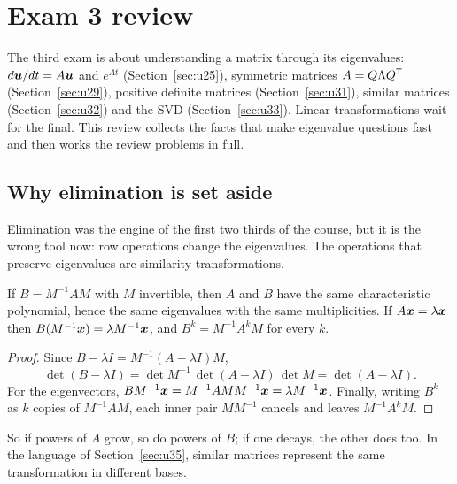 \section{Exam 3 review}\label{sec:u37}

The third exam is about understanding a matrix through its eigenvalues: $d\boldsymbol{u}/dt=A\boldsymbol{u}$ and $e^{At}$ (Section~\ref{sec:u25}), symmetric matrices $A=Q\Lambda Q^{\mathsf{T}}$ (Section~\ref{sec:u29}), positive definite matrices (Section~\ref{sec:u31}), similar matrices (Section~\ref{sec:u32}) and the SVD (Section~\ref{sec:u33}). Linear transformations wait for the final. This review collects the facts that make eigenvalue questions fast and then works the review problems in full.

\subsection{Why elimination is set aside}

Elimination was the engine of the first two thirds of the course, but it is the wrong tool now: row operations change the eigenvalues. The operations that preserve eigenvalues are similarity transformations.

\begin{proposition}\label{prop:u37-similar}
If $B=M^{-1}AM$ with $M$ invertible, then $A$ and $B$ have the same characteristic polynomial, hence the same eigenvalues with the same multiplicities. If $A\boldsymbol{x}=\lambda\boldsymbol{x}$ then $B(M^{-1}\boldsymbol{x})=\lambda M^{-1}\boldsymbol{x}$, and $B^{k}=M^{-1}A^{k}M$ for every $k$.
\end{proposition}
\begin{proof}
Since $B-\lambda I=M^{-1}(A-\lambda I)M$,
\[
\det(B-\lambda I)=\det M^{-1}\,\det(A-\lambda I)\,\det M=\det(A-\lambda I).
\]
For the eigenvectors, $BM^{-1}\boldsymbol{x}=M^{-1}AMM^{-1}\boldsymbol{x}=\lambda M^{-1}\boldsymbol{x}$. Finally, writing $B^{k}$ as $k$ copies of $M^{-1}AM$, each inner pair $MM^{-1}$ cancels and leaves $M^{-1}A^{k}M$.
\end{proof}

So if powers of $A$ grow, so do powers of $B$; if one decays, the other does too. In the language of Section~\ref{sec:u35}, similar matrices represent the same transformation in different bases.

